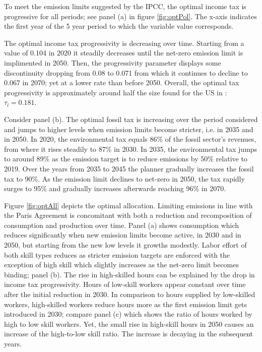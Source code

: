 To meet the emission limits suggested by the IPCC, the optimal income tax is progressive for all periods; see panel (a) in figure \ref{fig:optPol}.  The x-axis indicates the first year of the 5 year period to which the variable value corresponds. 

The optimal income tax progressivity is decreasing over time. Starting from a value of 0.104 in 2020 it steadily decreases until the net-zero emission limit is implimented in 2050. Then, the progressivity parameter displays some discontinuity dropping from 0.08 to 0.071 from which it continues to decline to 0.067 in 2070; yet at a lower rate than before 2050. 
Overall, the optimal tax progressivity is approximately  around half the size found for the US in \cite{Heathcote2017OptimalFramework}: $\tau_{l}=0.181$.

Consider panel (b). The optimal fossil tax is increasing over the period considered and jumps to higher levels when emission limits become stricter, i.e. in 2035 and in 2050.
In 2020, the environmental tax equals 86\% of the fossil sector's revenues, from where it rises steadily to 87\% in 2030.  In 2035, the environmental tax jumps to around 89\% as the emission target is to reduce emissions by 50\% relative to 2019. Over the years from 2035 to 2045 the planner gradually increases the fossil tax to 90\%. As the emission limit declines to net-zero in 2050, the tax rapidly surges to 95\% and gradually increases afterwards reaching 96\% in 2070. 


Figure \ref{fig:optAll} depicts the optimal allocation. Limiting emissions in line with the Paris Agreement is concomitant with both a reduction and recomposition of consumption and production over time. 
Panel (a) shows consumption which reduces significantly when new emission limits become active, in 2030 and in 2050, but starting from the new low levels it growths modestly. Labor effort of both skill types reduces as stricter emission targets are enforced with the exception of high skill which slightly increases as the net-zero limit becomes binding; panel (b). The rise in high-skilled hours can be explained by the drop in income tax progressivity. Hours of low-skill workers appear constant over time after the initial reduction in 2030.  In comparison to hours supplied by low-skilled workers, high-skilled workers reduce hours more as the first emission limit gets introduced in 2030; compare panel (c) which shows the ratio of hours worked by high to low skill workers. Yet, the small rise in high-skill hours in 2050 causes an increase of the high-to-low skill ratio. The increase is decaying in the subsequent years.

